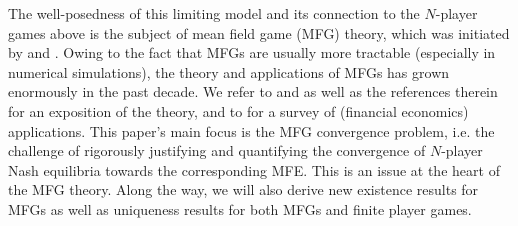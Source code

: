 \documentclass[11pt,reqno]{amsart}
\numberwithin{equation}{section}
\theoremstyle{definition}
\begin{document}
The well-posedness of this limiting model and its connection to the $N$-player games above is the subject of mean field game (MFG) theory, which was initiated by \citet{lasry2006jeux,lasry2006jeux2,lasry2007mean} and \citet{huang2006large,huang2007large}. Owing to the fact that MFGs are usually more tractable (especially in numerical simulations), the theory and applications of MFGs has grown enormously in the past decade.
We refer to \citet{cardelbook1,cardelbook2} and \citet{bensoussan2013mean} as well as the references therein for an exposition of the theory, and to \citet{CarmonaSurvery20} for a survey of (financial economics) applications.
This paper's main focus is the MFG convergence problem, i.e. the challenge of rigorously justifying and quantifying the convergence of $N$-player Nash equilibria towards the corresponding MFE. This is an issue at the heart of the MFG theory.
Along the way, we will also derive new existence results for MFGs as well as uniqueness results for both MFGs and finite player games.
\end{document}
